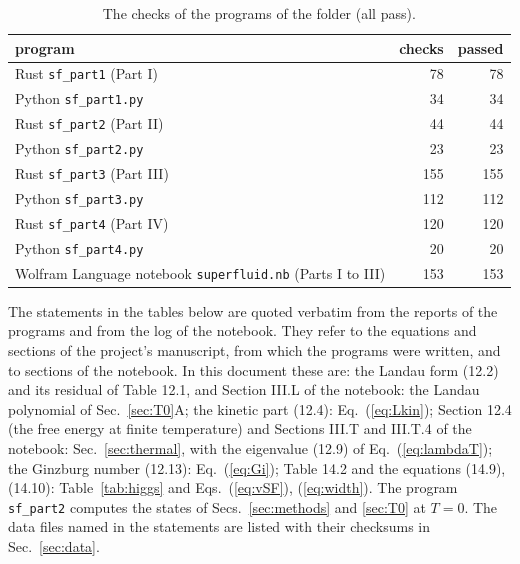 \documentclass[aps,prd,onecolumn,superscriptaddress,nofootinbib,floatfix,longbibliography]{revtex4-2}
\begin{document}
\begin{table}[h]
\caption{\label{tab:checkcounts}The checks of the programs of the folder (all pass).}
\begin{ruledtabular}
\begin{tabular}{lrr}
program & checks & passed \\
\hline
Rust \texttt{sf\_part1} (Part I) & 78 & 78 \\
Python \texttt{sf\_part1.py} & 34 & 34 \\
Rust \texttt{sf\_part2} (Part II) & 44 & 44 \\
Python \texttt{sf\_part2.py} & 23 & 23 \\
Rust \texttt{sf\_part3} (Part III) & 155 & 155 \\
Python \texttt{sf\_part3.py} & 112 & 112 \\
Rust \texttt{sf\_part4} (Part IV) & 120 & 120 \\
Python \texttt{sf\_part4.py} & 20 & 20 \\
Wolfram Language notebook \texttt{superfluid.nb} (Parts I to III) & 153 & 153 \\
\end{tabular}
\end{ruledtabular}
\end{table}

The statements in the tables below are quoted verbatim from the reports of the programs and from the log of the notebook.
They refer to the equations and sections of the project's manuscript, from which the programs were written, and to sections
of the notebook. In this document these are: the Landau form (12.2) and its residual of Table 12.1, and Section III.L of the
notebook: the Landau polynomial of Sec.~\ref{sec:T0}A; the kinetic part (12.4): Eq.~(\ref{eq:Lkin}); Section 12.4 (the free
energy at finite temperature) and Sections III.T and III.T.4 of the notebook: Sec.~\ref{sec:thermal}, with the eigenvalue
(12.9) of Eq.~(\ref{eq:lambdaT}); the Ginzburg number (12.13): Eq.~(\ref{eq:Gi}); Table 14.2 and the equations (14.9), (14.10):
Table~\ref{tab:higgs} and Eqs.~(\ref{eq:vSF}), (\ref{eq:width}). The program \texttt{sf\_part2} computes the states of
Secs.~\ref{sec:methods} and \ref{sec:T0} at $T=0$. The data files named in the statements are listed with their checksums in
Sec.~\ref{sec:data}.
\end{document}
